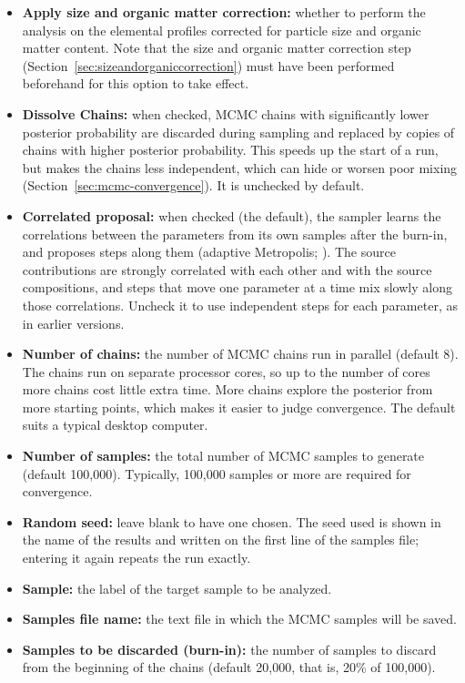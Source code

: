 \documentclass[12pt]{report}
\begin{document}
\begin{itemize}
    \item \textbf{Apply size and organic matter correction:} whether to perform the analysis on the elemental profiles corrected for particle size and organic matter content. Note that the size and organic matter correction step (Section~\ref{sec:sizeandorganiccorrection}) must have been performed beforehand for this option to take effect.
    \item \textbf{Dissolve Chains:} when checked, MCMC chains with significantly lower posterior probability are discarded during sampling and replaced by copies of chains with higher posterior probability. This speeds up the start of a run, but makes the chains less independent, which can hide or worsen poor mixing (Section~\ref{sec:mcmc-convergence}). It is unchecked by default.
    \item \textbf{Correlated proposal:} when checked (the default), the sampler learns the correlations between the parameters from its own samples after the burn-in, and proposes steps along them (adaptive Metropolis; \citealp{haario2001adaptive}). The source contributions are strongly correlated with each other and with the source compositions, and steps that move one parameter at a time mix slowly along those correlations. Uncheck it to use independent steps for each parameter, as in earlier versions.
    \item \textbf{Number of chains:} the number of MCMC chains run in parallel (default 8). The chains run on separate processor cores, so up to the number of cores more chains cost little extra time. More chains explore the posterior from more starting points, which makes it easier to judge convergence. The default suits a typical desktop computer.
    \item \textbf{Number of samples:} the total number of MCMC samples to generate (default 100{,}000). Typically, 100{,}000 samples or more are required for convergence.
    \item \textbf{Random seed:} leave blank to have one chosen. The seed used is shown in the name of the results and written on the first line of the samples file; entering it again repeats the run exactly.
    \item \textbf{Sample:} the label of the target sample to be analyzed.
    \item \textbf{Samples file name:} the text file in which the MCMC samples will be saved.
    \item \textbf{Samples to be discarded (burn-in):} the number of samples to discard from the beginning of the chains (default 20{,}000, that is, 20\% of 100{,}000).
\end{itemize}
\end{document}
